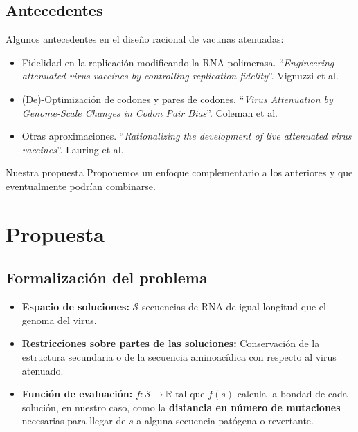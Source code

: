 \documentclass{beamer}
\begin{document}
\subsection{Antecedentes}
\begin{frame}
Algunos antecedentes en el dise\~no racional de vacunas atenuadas:
 \begin{itemize}
  \item Fidelidad en la replicaci\'on modificando la RNA polimerasa.
``\textit{Engineering attenuated virus vaccines by controlling replication
fidelity}''. Vignuzzi et al.
  \item (De)-Optimizaci\'on de codones y pares de codones.
``\textit{Virus Attenuation by Genome-Scale Changes in Codon Pair Bias}''.
Coleman et al.
  \item Otras aproximaciones. ``\textit{Rationalizing the development of live
attenuated virus vaccines}''. Lauring et al.
 \end{itemize}
\pause
\begin{block}{Nuestra propuesta}
 Proponemos un enfoque complementario a los anteriores y que eventualmente
podr\'ian combinarse.
\end{block}

\end{frame}

\section{Propuesta}
\subsection{Formalizaci\'on del problema}
\begin{frame}

\begin{itemize} 
 \item \textbf{Espacio de soluciones:} $\mathcal{S}$ secuencias de RNA de igual
longitud que el genoma del virus. 
\pause
 \item \textbf{Restricciones sobre partes de las soluciones:} Conservaci\'on de
la estructura secundaria o de la secuencia aminoac\'idica con respecto al virus
atenuado.
\pause
 \item \textbf{Funci\'on de evaluaci\'on:} $f: \mathcal{S} \rightarrow
\mathbb{R}$ tal que $f(s)$ calcula la bondad de cada soluci\'on, en
nuestro caso, como la \textbf{distancia en n\'umero de mutaciones} necesarias
para llegar de $s$ a alguna secuencia pat\'ogena o revertante.
\end{itemize}
\end{frame}
\end{document}
